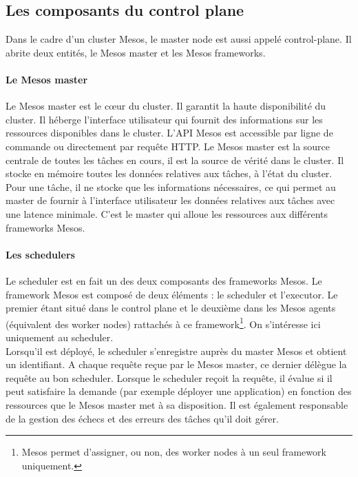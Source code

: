 \documentclass[11pt,fleqn]{book} %
\begin{document}
\subsection*{Les composants du control plane}
Dans le cadre d'un cluster Mesos, le master node est aussi appelé control-plane. Il abrite deux entités, le Mesos master et les Mesos frameworks.
\paragraph*{Le Mesos master}
Le Mesos master est le cœur du cluster. Il garantit la haute disponibilité du cluster. Il héberge l'interface utilisateur qui fournit des informations sur les ressources disponibles dans le cluster. L'API Mesos est accessible par ligne de commande ou directement par requête HTTP. Le Mesos master est la source centrale de toutes les tâches en cours, il est la source de vérité dans le cluster. Il stocke en mémoire toutes les données relatives aux tâches, à l'état du cluster. Pour une tâche, il ne stocke que les informations nécessaires, ce qui permet au master de fournir à l'interface utilisateur les données relatives aux tâches avec une latence minimale. C'est le master qui alloue les ressources aux différents frameworks Mesos.

\paragraph*{Les schedulers}
Le scheduler est en fait un des deux composants des frameworks Mesos. Le framework Mesos est composé de deux éléments : le scheduler et l'executor. Le premier étant situé dans le control plane et le deuxième dans les Mesos agents (équivalent des worker nodes) rattachés à ce framework\footnote{Mesos permet d'assigner, ou non, des worker nodes à un seul framework uniquement.}. On s'intéresse ici uniquement au scheduler. \\

Lorsqu'il est déployé, le scheduler s'enregistre auprès du master Mesos et obtient un identifiant. A chaque requête reçue par le Mesos master, ce dernier délègue la requête au bon scheduler. Lorsque le scheduler reçoit la requête, il évalue si il peut satisfaire la demande (par exemple déployer une application) en fonction des ressources que le Mesos master met à sa disposition. Il est également responsable de la gestion des échecs et des erreurs des tâches qu'il doit gérer. \\
\end{document}
